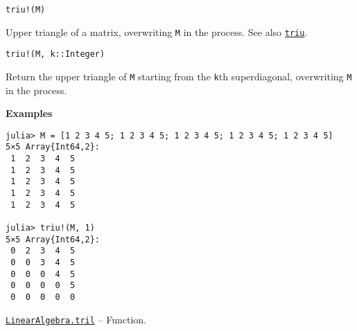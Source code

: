\begin{adjustwidth}{2em}{0pt}


\begin{verbatim}
triu!(M)
\end{verbatim}

Upper triangle of a matrix, overwriting \texttt{M} in the process. See also \hyperlink{13861148483706203681}{\texttt{triu}}.




\begin{lstlisting}
triu!(M, k::Integer)
\end{lstlisting}

Return the upper triangle of \texttt{M} starting from the \texttt{k}th superdiagonal, overwriting \texttt{M} in the process.

\textbf{Examples}


\begin{verbatim}
julia> M = [1 2 3 4 5; 1 2 3 4 5; 1 2 3 4 5; 1 2 3 4 5; 1 2 3 4 5]
5×5 Array{Int64,2}:
 1  2  3  4  5
 1  2  3  4  5
 1  2  3  4  5
 1  2  3  4  5
 1  2  3  4  5

julia> triu!(M, 1)
5×5 Array{Int64,2}:
 0  2  3  4  5
 0  0  3  4  5
 0  0  0  4  5
 0  0  0  0  5
 0  0  0  0  0
\end{verbatim}



\end{adjustwidth}
\hypertarget{6919124555890239966}{} 
\hyperlink{6919124555890239966}{\texttt{LinearAlgebra.tril}}  -- {Function.}

